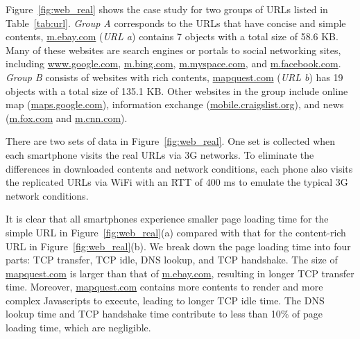 



\label{sec:web_real}


Figure~\ref{fig:web_real} shows the case study for two groups of
URLs listed in Table~\ref{tab:url}. \emph{Group A} corresponds to 
the URLs that have concise and simple contents, \eg \url{m.ebay.com}
(\emph{URL a}) contains 7 objects with a total size of 58.6 KB.
Many of these websites are search engines or portals to social
networking sites, including \url{www.google.com}, \url{m.bing.com},
\url{m.myspace.com}, and \url{m.facebook.com}. \emph{Group B} 
consists of websites with rich contents, \eg \url{mapquest.com}
(\emph{URL b}) has 19 objects with a total size of 135.1 KB. Other
websites in the group include online map (\url{maps.google.com}), 
information exchange (\url{mobile.craigslist.org}), and news 
(\url{m.fox.com} and \url{m.cnn.com}).

There are two sets of data in Figure~\ref{fig:web_real}. One set is
collected when each smartphone visits the real URLs via 3G networks. 
To eliminate the differences in downloaded contents and network 
conditions, each phone also visits the replicated URLs via WiFi with
an RTT of 400 ms to emulate the typical 3G network conditions.

It is clear that all smartphones experience smaller page loading
time for the simple URL in Figure~\ref{fig:web_real}(a) compared with 
that for the content-rich URL in Figure~\ref{fig:web_real}(b). We 
break down the page loading time into four parts: TCP transfer, 
TCP idle, DNS lookup, and TCP handshake. The size of \url{mapquest.com} 
is larger than that of \url{m.ebay.com}, resulting in longer TCP 
transfer time. Moreover, \url{mapquest.com} contains more contents 
to render and more complex Javascripts to execute, leading to longer 
TCP idle time. The DNS lookup time and TCP handshake time contribute
to less than 10\% of page loading time, which are negligible.

